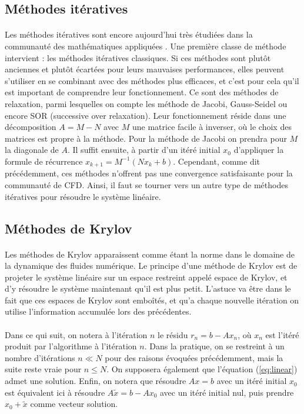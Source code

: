 	\subsection{Méthodes itératives}

		\paragraph{}
		Les méthodes itératives sont encore aujourd'hui très étudiées dans la communauté des mathématiques appliquées \cite{OlshanskiiTyrtyshnikov2014, Saad2003, TrefethenBau1997}.
		Une première classe de méthode intervient : les méthodes itératives classiques.
		Si ces méthodes sont plutôt anciennes et plutôt écartées pour leurs mauvaises performances, elles peuvent s'utiliser en se combinant avec des méthodes plus efficaces, et c'est pour cela qu'il est important de comprendre leur fonctionnement.
		Ce sont des méthodes de relaxation, parmi lesquelles on compte les méthode de Jacobi, Gauss-Seidel ou encore SOR (successive over relaxation).
		Leur fonctionnement réside dans une décomposition $A = M - N$ avec $M$ une matrice facile à inverser, où le choix des matrices est propre à la méthode.
		Pour la méthode de Jacobi on prendra pour $M$ la diagonale de $A$.
		Il suffit ensuite, à partir d'un itéré initial $x_0$ d'appliquer la formule de récurrence $x_{k+1} = M^{-1}\left(Nx_k + b\right)$.
		Cependant, comme dit précédemment, ces méthodes n'offrent pas une convergence satisfaisante pour la communauté de CFD.
		Ainsi, il faut se tourner vers un autre type de méthodes itératives pour résoudre le système linéaire.

	\subsection{Méthodes de Krylov}

		\paragraph{}
		Les méthodes de Krylov apparaissent comme étant la norme dans le domaine de la dynamique des fluides numérique.
		Le principe d'une méthode de Krylov est de projeter le système linéaire sur un espace restreint appelé espace de Krylov, et d'y résoudre le système maintenant qu'il est plus petit.
		L'astuce va être dans le fait que ces espaces de Krylov sont emboîtés, et qu'a chaque nouvelle itération on utilise l'information accumulée lors des précédentes.

		\paragraph{}
		Dans ce qui suit, on notera à l'itération $n$ le résidu $r_n = b - Ax_n$, où $x_n$ est l'itéré produit par l'algorithme à l'itération $n$.
		Dans la pratique, on se restreint à un nombre d'itérations $n\ll N$ pour des raisons évoquées précédemment, mais la suite reste vraie pour $n\le N$.
		On supposera également que l'équation (\ref{eq:linear}) admet une solution.
		Enfin, on notera que résoudre $Ax = b$ avec un itéré initial $x_0$ est équivalent ici à résoudre $A\tilde{x} = b - Ax_0$ avec un itéré initial nul, puis prendre $x_0 + \tilde{x}$ comme vecteur solution.

